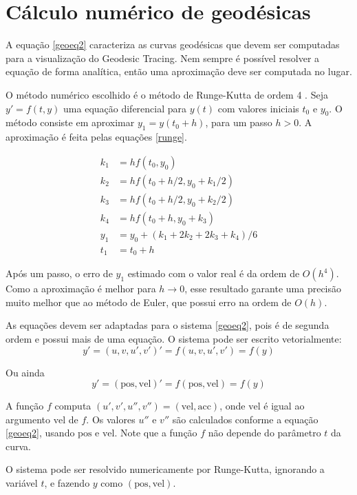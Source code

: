 \chapter{Cálculo numérico de geodésicas}
\label{numeric}

A equação \ref{geoeq2} caracteriza as curvas geodésicas que devem ser 
computadas para a visualização do Geodesic Tracing.
Nem sempre é possível resolver a equação de forma analítica, então uma aproximação
deve ser computada no lugar.

O método numérico escolhido é o método de Runge-Kutta de ordem 4 \cite{Anal:1}.
Seja $y' = f(t, y)$ uma equação diferencial para $y(t)$ com valores iniciais $t_0$ e $y_0$.
O método consiste em aproximar $y_1 = y(t_0+h)$, para um passo $h>0$.
A aproximação é feita pelas equações \ref{runge}.

\begin{equation}
\label{runge}
\begin{split}
k_1 & = hf(t_0, y_0) \\
k_2 & = hf(t_0 + h/2, y_0 + k_1/2) \\
k_3 & = hf(t_0 + h/2, y_0 + k_2/2) \\
k_4 & = hf(t_0 + h, y_0 + k_3) \\
y_1 & = y_0 + (k_1 + 2k_2 + 2k_3 + k_4)/6 \\
t_1 & = t_0 + h
\end{split}
\end{equation}

Após um passo, o erro de $y_1$ estimado com o valor real é da ordem de $O(h^4)$.
Como a aproximação é melhor para $h \rightarrow 0$, esse resultado garante uma precisão
muito melhor que ao método de Euler, que possui erro na ordem de $O(h)$.

As equações devem ser adaptadas para o sistema \ref{geoeq2}, pois é de 
segunda ordem e possui mais de uma equação.
O sistema pode ser escrito vetorialmente:
\[y' = (u, v, u', v')' = f(u, v, u', v') = f(y)\]

Ou ainda 
\[y' = (\text{pos}, \text{vel})' = f(\text{pos}, \text{vel}) = f(y)\]

A função $f$ computa $(u', v', u'', v'') = (\text{vel}, \text{acc})$, onde $\text{vel}$ é
igual ao argumento $\text{vel}$ de $f$. Os valores $u''$ e $v''$ são calculados conforme a equação
\ref{geoeq2}, usando $\text{pos}$ e $\text{vel}$.
Note que a função $f$ não depende do parâmetro $t$ da curva.

O sistema pode ser resolvido numericamente por Runge-Kutta, ignorando a variável $t$,
e fazendo $y$ como $(\text{pos}, \text{vel})$.

